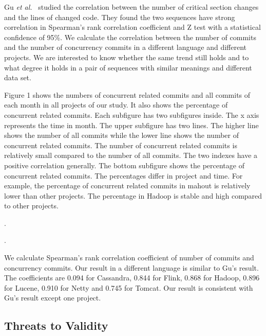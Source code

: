Gu \emph{et al.}~\cite{conf/sigsoft/GuJSZL15} studied the correlation between the number of critical section changes and the lines of changed code. They found the two sequences have strong correlation in Spearman's rank correlation coefficient and Z test with a statistical confidence of 95\%. We calculate the correlation between the number of commits and the number of concurrency commits in a different language and different projects. We are interested to know whether the same trend still holds and to what degree it holds in a pair of sequences with similar meanings and different data set.

Figure 1 shows the numbers of concurrent related commits and all commits of each month in all projects of our study. It also shows the percentage of concurrent related commits. Each subfigure has two subfigures inside. The x axis represents the time in month. The upper subfigure has two lines. The higher line shows the number of all commits while the lower line shows the number of concurrent related commits. The number of concurrent related commits is relatively small compared to the number of all commits. The two indexes have a positive correlation generally. The bottom subfigure shows the percentage of concurrent related commits. The percentages differ in project and time. For example, the percentage of concurrent related commits in mahout is relatively lower than other projects. The percentage in Hadoop is stable and high compared to other projects.

.

.

We calculate Spearman's rank correlation coefficient of number of commits and concurrency commits. Our result in a different language is similar to Gu's result. The coefficients are 0.094 for Cassandra, 0.844 for Flink, 0.868 for Hadoop, 0.896 for Lucene, 0.910 for Netty and 0.745 for Tomcat. Our result is consistent with Gu's result except one project.


\subsection{Threats to Validity}


